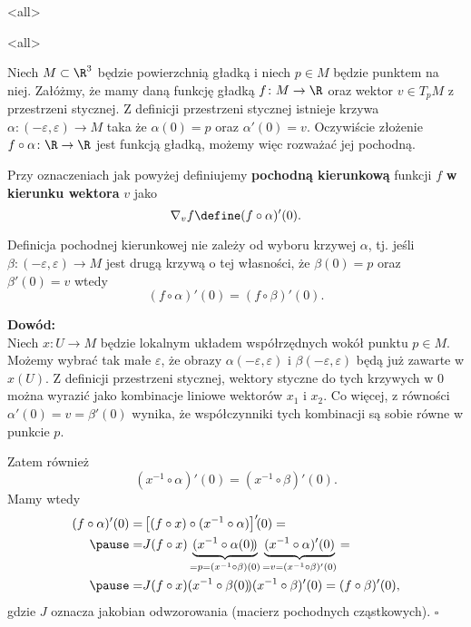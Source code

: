 \mode*
\mode<all>{}

\mode<all>{}

\begin{frame}

Niech $M\subset \R^3$ będzie powierzchnią gładką i niech $p\in M$ będzie punktem na niej. Załóżmy, że mamy daną funkcję gładką $f\colon M\to \R$ oraz wektor $v\in T_pM$ z przestrzeni stycznej. \pause Z definicji przestrzeni stycznej istnieje krzywa $\alpha\colon (-\varepsilon,\varepsilon)\to M$ taka że $\alpha(0)=p$ oraz $\alpha'(0)=v$. \pause Oczywiście złożenie $f\circ \alpha\colon \R\to \R$ jest funkcją gładką, możemy więc rozważać jej pochodną.

\pause \begin{definicja}
Przy oznaczeniach jak powyżej definiujemy \textbf{pochodną kierunkową} funkcji $f$ \textbf{w kierunku wektora} $v$ jako 
\[\nabla_vf\define (f\circ \alpha)'(0).\]
\end{definicja}

\end{frame}
\begin{frame}
\begin{lemat}
Definicja pochodnej kierunkowej nie zależy od wyboru krzywej $\alpha$, tj. jeśli $\beta\colon (-\varepsilon,\varepsilon)\to M$ jest drugą krzywą o tej własności, że $\beta(0)=p$ oraz $\beta'(0)=v$ wtedy \[\left(f\circ \alpha\right)'(0)=\left(f\circ \beta\right)'(0).\]
\end{lemat}
\textcolor{ared}{\textbf{Dowód:}}\\\pause
Niech $x\colon U\to M$ będzie lokalnym układem współrzędnych wokół punktu $p\in M$. Możemy wybrać tak małe $\varepsilon$, że obrazy $\alpha(-\varepsilon,\varepsilon)$ i $\beta(-\varepsilon,\varepsilon)$ będą już zawarte w $x(U)$. \pause Z definicji przestrzeni stycznej, wektory styczne do tych krzywych w $0$ można wyrazić jako kombinacje liniowe wektorów $x_1$ i $x_2$. \pause {}Co więcej, z równości $\alpha'(0)=v=\beta'(0)$ wynika, że współczynniki tych kombinacji są sobie równe w punkcie $p$. 


\end{frame}
\begin{frame}

Zatem również 
\[\left(x^{-1}\circ \alpha\right)'\!\!(0)=\left(x^{-1}\circ \beta\right)'\!\!(0).\] \pause Mamy wtedy
\begin{align*}
(f\circ \alpha)'(0)=&\left[(f\circ x)\circ (x^{-1}\circ \alpha)\right]'\!\!(0)=\\\pause
=& J(f\circ x)\underbrace{(x^{-1}\circ \alpha(0)\!)}_{=p=(x^{-1}\circ \beta)(0)}\underbrace{(x^{-1}\circ \alpha)'(0)}_{=v=(x^{-1}\circ \beta)'(0)}=\\\pause
=& J(f\circ x)(x^{-1}\circ \beta(0)\!)(x^{-1}\circ \beta)'(0)=(f\circ\beta)'(0),
\end{align*}
gdzie $J$ oznacza jakobian odwzorowania (macierz pochodnych cząstkowych).
\hfill $\square$

\end{frame}
